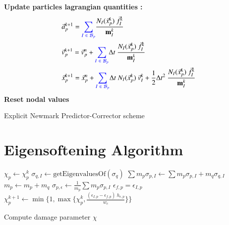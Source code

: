 \documentclass[preprint,12pt,a4paper]{elsarticle}
\newcommand{\tens}[1]{
  \ensuremath{\mathbf{{#1}}}
}
\begin{document}
\begin{algorithm}[H]
    \textbf{Update particles lagrangian quantities :}
    \begin{align*}
      &\vec{a}_p^{k+1} = \textcolor{blue}{\sum_{I\ \in\ \mathcal{B}_p}} \frac{N_{I}(\vec{x}_p^k)\ \vec{f}_{I}^{k}}{\tens{m}_I^k}\\
      &\vec{v}_p^{k+1} = \vec{v}_p^n + \textcolor{blue}{\sum_{I\ \in\ \mathcal{B}_p}} \Delta t\
        \frac{N_{I}(\vec{x}_p^k) \
        \vec{f}_{I}^{k}}{\tens{m}_I^k}\\
      &\vec{x}_p^{k+1} = \vec{x}_p^n + \textcolor{blue}{\sum_{I\ \in\ \mathcal{B}_p}} \Delta t\
         N_{I}(\vec{x}_p^k) \ \vec{v}_{I}^{k} + 
        \frac{1}{2}\Delta t^2\ \frac{N_{I}(\vec{x}_p^k)\
        \vec{f}_{I}^{k}}{\tens{m}_I^k}
    \end{align*}\;
    \vspace{-0.5cm}
    \textbf{Reset nodal values}\;
    \label{alg-epc}
    \caption{Explicit Newmark Predictor-Corrector scheme}
\end{algorithm} 

\section{Eigensoftening Algorithm}
\label{sec:eigens-algor-1}

\begin{algorithm}[H]
  \DontPrintSemicolon
  $\chi_p \leftarrow \chi_p^{k}$ \;
  \For{$p$ to $N_p$}
  {
    {
      {
        $\sigma_{q,I} \leftarrow \text{getEigenvaluesOf} (\sigma_{q}) $ \;
        {
          $ \sum m_p\sigma_{p,I} \leftarrow \sum m_p\sigma_{p,I} + m_q\sigma_{q,I}$ \;
        }
        $ m_p \leftarrow m_p + m_q$ \;
      }
      $\sigma_{p,\epsilon} \leftarrow \frac{1}{m_p} \sum m_p\sigma_{p,I}$\;
      {
        $\epsilon_{f,p} = \epsilon_{I,p}$ \;  
      }
      {
        $\chi_p^{k+1} \leftarrow \min\Big \{1 , \max \{\chi_p^{k},
        \frac{(\epsilon_{I,p}- \epsilon_{f,p})\ h_{\epsilon,p}}{w_c}
        \} \Big \}$ \;
      }
    }
  }
    \label{alg-eigens}
    \caption{Compute damage parameter $\chi$}
\end{algorithm}
\end{document}
